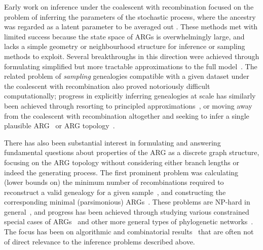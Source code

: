 \documentclass{article}
\begin{document}
Early work on inference under the coalescent with recombination
focused on the problem of
inferring the parameters of the
stochastic process, where the ancestry was regarded as a
latent parameter to be averaged out
\citep[e.g.][]{griffiths1996ancestral,kuhner2000maximum, nielsen2000estimation,
fearnhead2001estimating}.
These methods met with limited success
because the state space of ARGs is overwhelmingly large, and
lacks a simple geometry or neighbourhood structure for inference or
sampling methods to  exploit.
Several breakthroughs in this direction were achieved through
formulating simplified but more tractable approximations to the full
model~\citep{mcvean2005approximating,marjoram2006fast,li2011inference,
paul2011accurate,schiffels2014inferring}.
The related problem of \emph{sampling} genealogies compatible with a given
dataset under the coalescent with recombination also proved notoriously difficult
computationally; progress in explicitly inferring genealogies at scale
has similarly been achieved through resorting to principled
approximations~\citep{rasmussen2014genome,mahmoudi2022bayesian},
or moving away from the coalescent with recombination altogether and seeking
to infer a single plausible ARG~\citep[e.g.][]{speidel2019method} or ARG
topology~\citep[e.g.][]{minichiello2006mapping,kelleher2019inferring}.

There has also been substantial interest in formulating and answering
fundamental questions about properties
of the ARG as a discrete graph structure, focusing on the ARG topology without considering
either branch lengths or indeed the generating process.
The first prominent problem was calculating (lower bounds on) the minimum number of
recombinations required to reconstruct a valid genealogy for a given
sample~\citep{myers2003bounds}, and constructing the corresponding
minimal (parsimonious)
ARGs~\citep{song2003parsimonious,song2005efficient,lyngso2005minimum}.
These problems are NP-hard in general~\citep{wang2001perfect}, and progress has
been achieved through studying various constrained special cases of ARGs~\citep[e.g.][]{gusfield2004optimal} and
other more general types of phylogenetic networks~\citep{huson2010phylogenetic}. The
focus has been on algorithmic and combinatorial results~\citep{gusfield2014recombinatorics}
that are often not of
direct relevance to the inference problems described above.

\end{document}
